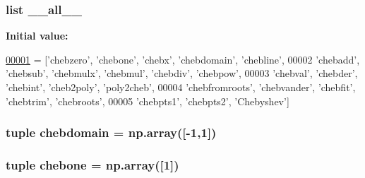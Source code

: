 \subsubsection[{\+\_\+\+\_\+all\+\_\+\+\_\+}]{\setlength{\rightskip}{0pt plus 5cm}list \+\_\+\+\_\+all\+\_\+\+\_\+}\label{namespacepyneb_1_1utils_1_1chebyshev_aa4a022e6ddacd362b83964da5cc5d044}
{\bfseries Initial value\+:}
\begin{DoxyCode}
\hypertarget{namespacepyneb_1_1utils_1_1chebyshev_l00001}{}\hyperlink{namespacepyneb_1_1utils_1_1chebyshev}{00001} = [\textcolor{stringliteral}{'chebzero'}, \textcolor{stringliteral}{'chebone'}, \textcolor{stringliteral}{'chebx'}, \textcolor{stringliteral}{'chebdomain'}, \textcolor{stringliteral}{'chebline'},
00002         \textcolor{stringliteral}{'chebadd'}, \textcolor{stringliteral}{'chebsub'}, \textcolor{stringliteral}{'chebmulx'}, \textcolor{stringliteral}{'chebmul'}, \textcolor{stringliteral}{'chebdiv'}, \textcolor{stringliteral}{'chebpow'},
00003         \textcolor{stringliteral}{'chebval'}, \textcolor{stringliteral}{'chebder'}, \textcolor{stringliteral}{'chebint'}, \textcolor{stringliteral}{'cheb2poly'}, \textcolor{stringliteral}{'poly2cheb'},
00004         \textcolor{stringliteral}{'chebfromroots'}, \textcolor{stringliteral}{'chebvander'}, \textcolor{stringliteral}{'chebfit'}, \textcolor{stringliteral}{'chebtrim'}, \textcolor{stringliteral}{'chebroots'},
00005         \textcolor{stringliteral}{'chebpts1'}, \textcolor{stringliteral}{'chebpts2'}, \textcolor{stringliteral}{'Chebyshev'}]
\end{DoxyCode}
\hypertarget{namespacepyneb_1_1utils_1_1chebyshev_abd5a8e86847ca6ea59d2a192f28604d4}{}
\subsubsection[{chebdomain}]{\setlength{\rightskip}{0pt plus 5cm}tuple chebdomain = np.\+array(\mbox{[}-\/1,1\mbox{]})}\label{namespacepyneb_1_1utils_1_1chebyshev_abd5a8e86847ca6ea59d2a192f28604d4}
\hypertarget{namespacepyneb_1_1utils_1_1chebyshev_ad07bc7eff7bee500f8644792e4f69712}{}
\subsubsection[{chebone}]{\setlength{\rightskip}{0pt plus 5cm}tuple chebone = np.\+array(\mbox{[}1\mbox{]})}\label{namespacepyneb_1_1utils_1_1chebyshev_ad07bc7eff7bee500f8644792e4f69712}
\hypertarget{namespacepyneb_1_1utils_1_1chebyshev_ab0a0ced0266ea763728bee66b728cbff}{}
